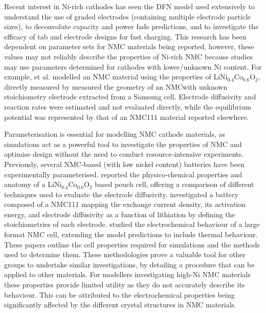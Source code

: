 \documentclass[aps,prb,twocolumn,superscriptaddress,reprint]{revtex4-1}
\begin{document}
Recent interest in Ni-rich cathodes has seen the DFN model used extensively to understand the use of graded electrodes (containing multiple electrode particle sizes), to deconvolute capacity and power fade predictions, and to investigate the efficacy of tab and electrode designs for fast charging.\cite{Richardson2020,Kindermann2017,Sturm2019} 
This research has been dependent on parameter sets for NMC materials being reported, however, these values may not reliably describe the properties of Ni-rich NMC because studies may use parameters determined for cathodes with lower/unknown Ni content. 
For example, \citeauthor{Richardson2020} et al. modelled an NMC material using the properties of LiNi$_{0.4}$Co$_{0.6}$O$_2$, directly measured by \citeauthor{Ecker2015}\cite{Richardson2020,Ecker2015} \citeauthor{Kindermann2017} measured the geometry of an NMC\textendash with unknown stoichiometry  \textendash electrode extracted from a Samsung cell.\cite{Kindermann2017} 
Electrode diffusivity and reaction rates were estimated and not evaluated directly, while the equilibrium potential was represented by that of an NMC111 material reported elsewhere.\cite{Stewart_2008} 

Parameterisation is essential for modelling NMC cathode materials, as simulations act as a powerful tool to investigate the properties of NMC and optimise design without the need to conduct resource-intensive experiments.\cite{shearing_2020_3D} 
Previously, several NMC-based (with low nickel content) batteries have been experimentally parameterised. \cite{Ecker2015,Schmalstieg_Rahe_Ecker_Sauer_2018,Liebig_2019} \citeauthor{Ecker2015} reported the physico-chemical properties and anatomy of a LiNi$_{0.4}$Co$_{0.6}$O$_2$ based pouch cell, offering a comparison of different techniques used to evaluate the electrode diffusivity. \cite{Ecker2015} \citeauthor{Schmalstieg_Rahe_Ecker_Sauer_2018} investigated a battery composed of a NMC111 mapping the exchange current density, its activation energy, and electrode diffusivity as a function of lithiation by defining the stoichiometries of each electrode. \cite{Schmalstieg_Rahe_Ecker_Sauer_2018} 
\citeauthor{Liebig_2019} studied the electrochemical behaviour of a large format NMC cell, extending the model predictions to include thermal behaviour. \cite{Liebig_2019} 
These papers outline the cell properties required for simulations and the methods used to determine them. 
These methodologies prove a valuable tool for other groups to undertake similar investigations, by detailing a procedure that can be applied to other materials. 
For modellers investigating high-Ni NMC materials these properties provide limited utility as they do not accurately describe its behaviour. 
This can be attributed to the electrochemical properties being significantly affected by the different crystal structures in NMC materials.\cite{noh2013comparison} 
\end{document}
